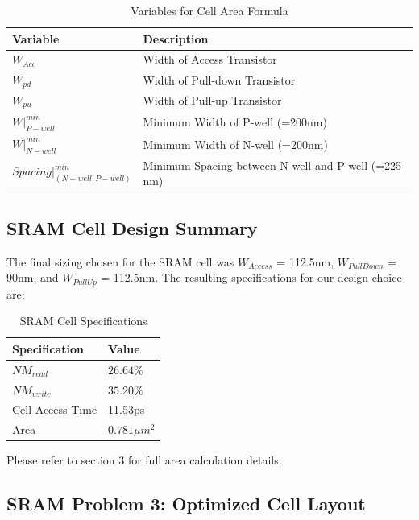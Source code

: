 \documentclass[10pt,letterpaper,onecolumn]{article}
\begin{document}
\begin{table}[h!]
\centering
\begin{tabular}{ |l|l| }
  \hline
  \textbf{Variable} & \textbf{Description} \\ 
  \hline
  $W_{Acc}$ & Width of Access Transistor \\  
  \hline
  $W_{pd}$ & Width of Pull-down Transistor\\
  \hline
  $W_{pu}$ & Width of Pull-up Transistor \\
  \hline
  $W|^{min}_{P-well}$ & Minimum Width of P-well (=200nm) \\
  \hline
  $W|^{min}_{N-well}$ & Minimum Width of N-well (=200nm)\\  
  \hline
  $Spacing|^{min}_{(N-well,P-well)}$ & Minimum Spacing between N-well and P-well (=225 nm)\\
  \hline
\end{tabular}
\caption{Variables for Cell Area Formula}
\label{table:area_formula}
\end{table}

\subsection{SRAM Cell Design Summary}
The final sizing chosen for the SRAM cell was $W_{Access}$ = 112.5nm, $W_{PullDown}$ = 90nm, and $W_{PullUp}$ = 112.5nm. The resulting specifications for our design choice are:
\begin{table}[h!]
\centering
\begin{tabu} to 0.5\textwidth { | X[l] | X[c] | }
  \hline
  \textbf{Specification} & \textbf{Value} \\ 
  \hline
  $NM_{read}$ & $26.64\%$ \\  
  \hline
  $NM_{write}$ & $35.20\%$ \\
  \hline
  Cell Access Time & 11.53ps \\
  \hline
  Area & $0.781\mu m^2$ \\
  \hline
\end{tabu}
\caption{SRAM Cell Specifications}
\label{table:SRAM_specs}
\end{table}
Please refer to section 3 for full area calculation details.
\clearpage

\begin{center}
\section{SRAM Problem 3: Optimized Cell Layout}
\end{center}
\end{document}
